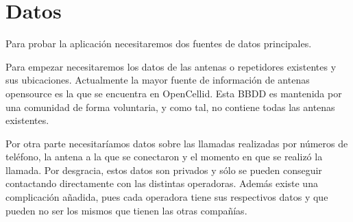   \section{Datos}
    Para probar la aplicación necesitaremos dos fuentes de datos principales.
    
    Para empezar necesitaremos los datos de las antenas o repetidores existentes y sus ubicaciones. Actualmente la mayor fuente de información de antenas opensource es la que se encuentra en OpenCellid\cite{opencellid}. Esta BBDD es mantenida por una comunidad de forma voluntaria, y como tal, no contiene todas las antenas existentes.
    
    Por otra parte necesitaríamos datos sobre las llamadas realizadas por números de teléfono, la antena a la que se conectaron y el momento en que se realizó la llamada. Por desgracia, estos datos son privados y sólo se pueden conseguir contactando directamente con las distintas operadoras. Además existe una complicación añadida, pues cada operadora tiene sus respectivos datos y que pueden no ser los mismos que tienen las otras compañías.